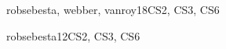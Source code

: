 \begin{syllabus}
\begin{unit}{\PLFunctionalProgramming}{}{robsebesta, webber, vanroy}{18}{CS2, CS3, CS6}
\begin{topics}%
    \item \PLFunctionalProgrammingTopicEffect
    \item \PLFunctionalProgrammingTopicProcessing
    \item \PLFunctionalProgrammingTopicFirst
    \item \PLFunctionalProgrammingTopicFunction
    \item \PLFunctionalProgrammingTopicDefining
\end{topics}
\begin{learningoutcomes}%
        \item \PLFunctionalProgrammingLOWriteBasic [\Usage] %
        \item \PLFunctionalProgrammingLOWriteUseful [\Usage] %
        \item \PLFunctionalProgrammingLOCompareAndTheApproach [\Assessment] %
        \item \PLFunctionalProgrammingLOCorrectlyReason [\Usage] %
        \item \PLFunctionalProgrammingLOUseFunctional [\Usage] %
        \item \PLFunctionalProgrammingLODefineAndAndOn [\Usage] %
\end{learningoutcomes}%
\end{unit}

\begin{unit}{\PLEventDrivenandReactiveProgramming}{}{robsebesta}{12}{CS2, CS3, CS6}
\begin{topics}%
        \item \PLEventDrivenandReactiveProgrammingTopicEvents%
        \item \PLEventDrivenandReactiveProgrammingTopicCanonical%
        \item \PLEventDrivenandReactiveProgrammingTopicUsingA%
        \item \PLEventDrivenandReactiveProgrammingTopicExternally%
        \item \PLEventDrivenandReactiveProgrammingTopicSeparation%
\end{topics}
\begin{learningoutcomes}%
        \item \PLEventDrivenandReactiveProgrammingLOWriteEvent [\Usage] %
        \item \PLEventDrivenandReactiveProgrammingLOExplainWhyDriven [\Familiarity] %
        \item \PLEventDrivenandReactiveProgrammingLODescribeAn [\Familiarity] %
\end{learningoutcomes}%
\end{unit}


\end{syllabus}
